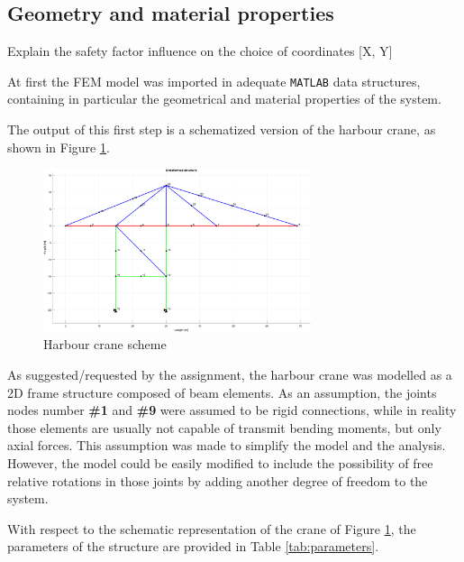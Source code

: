 \subsection{Geometry and material properties}
\label{sub:geometry_and_material_properties}

\begin{center}
    \huge{Explain the safety factor influence on the choice of coordinates [X, Y]}
\end{center}

At first the FEM model was imported in adequate \texttt{MATLAB} data structures, containing in particular the geometrical and material properties of the system.

The output of this first step is a schematized version of the harbour crane, as shown in Figure \ref{fig:harbour-crane-scheme}.

\begin{figure}[H]
    \centering
    \includegraphics[width=0.7\textwidth]{img/MATLAB/undeformed-structure.png}
    \caption{Harbour crane scheme}
    \label{fig:harbour-crane-scheme}
\end{figure}

As suggested/requested by the assignment, the harbour crane was modelled as a 2D frame structure composed of beam elements.
As an assumption, the joints nodes number \textbf{\#1} and \textbf{\#9} were assumed to be rigid connections, while in reality those elements are usually not capable of transmit bending moments, but only axial forces.
This assumption was made to simplify the model and the analysis.
However, the model could be easily modified to include the possibility of free relative rotations in those joints by adding another degree of freedom to the system.

With respect to the schematic representation of the crane of Figure \ref{fig:harbour-crane-scheme}, the parameters of the structure are provided in Table \ref{tab:parameters}.

